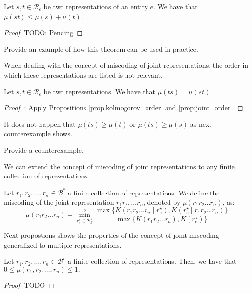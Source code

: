 \begin{proposition}
Let $s, t \in \mathcal{R}_e$ be two representations of an entity $e$. We have that $\mu( st ) \leq \mu(s) + \mu(t)$.
\end{proposition}
\begin{proof}
{\color{red} TODO: Pending}
\end{proof}

\begin{example}
{\color{red} Provide an example of how this theorem can be used in practice.}
\end{example}

When dealing with the concept of miscoding of joint representations, the order in which these representations are listed is not relevant.

\begin{proposition}
Let $s, t \in \mathcal{R}_e$ be two representations. We have that $\mu(ts) = \mu(st)$.
\end{proposition}
\begin{proof}
{\color{red}: Apply Propositions \ref{prop:kolmogorov_order} and \ref{prop:joint_order}.}
\end{proof}

It does not happen that $\mu(ts) \geq \mu(t)$ or $\mu(ts) \geq \mu(s)$ as next counterexample shows.

\begin{example}
{\color{red} Provide a counterexample.}
\end{example}

We can extend the concept of miscoding of joint representations to any finite collection of representations.

\begin{definition}
Let $r_1, r_2, \ldots, r_n \in \mathcal{B}^\ast$ a finite collection of representations. We define the miscoding of the joint representation $r_1 r_2, \ldots r_n$, denoted by $\mu(r_1 r_2 \ldots r_n)$, as:
\[
\mu(r_1 r_2 \ldots r_n) = \overset{o}{ \underset{ r^\star_e \in \mathcal{R}^\star_\mathcal{E} } \min} \frac{ \max\{ K \left( r_1 r_2 \ldots r_n \mid r^\star_e \right), K \left( r^\star_e \mid r_1 r_2 \ldots r_n \right) \} } { \max\{ K \left( r_1 r_2 \ldots r_n \right), K \left( r^\star_e \right) \} }
\]
\end{definition}

Next propostions shows the properties of the concept of joint miscoding generalized to multiple representations.

\begin{proposition}
Let $r_1, r_2, \ldots, r_n \in \mathcal{B}^\star$ a finite collection of representations. Then, we have that $0 \leq \mu(r_1, r_2, \ldots, r_n) \leq 1.$
\end{proposition}
\begin{proof}
{\color{red} TODO}
\end{proof}

